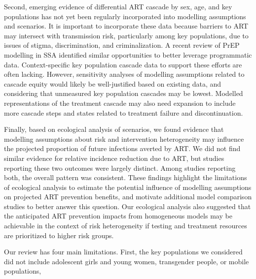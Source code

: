 \par %
Second, emerging evidence of differential ART cascade by sex, age, and key populations
\cite{Mountain2014,Lancaster2016,Green2020}
has not yet been regularly incorporated into modelling assumptions and scenarios.
It is important to incorporate these data because barriers to ART may intersect with transmission risk,
particularly among key populations, due to issues of stigma, discrimination, and criminalization.
\cite{Ortblad2019,Baral2019}
A recent review of PrEP modelling in SSA\cite{Case2019}
identified similar opportunities to better leverage programmatic data.
Context-specific key population cascade data to support these efforts are often lacking.\cite{Mountain2014}
However, sensitivity analyses of modelling assumptions related to cascade equity
would likely be well-justified based on existing data,\cite{Mountain2014,Green2020}
and considering that unmeasured key population cascades may be lowest.\cite{Roberts2020}
Modelled representations of the treatment cascade may also need expansion
to include more cascade steps and states related to treatment failure and discontinuation.
\par
Finally, based on ecological analysis of scenarios, we found evidence that
modelling assumptions about risk and intervention heterogeneity
may influence the projected proportion of future infections averted by ART.
We did not find similar evidence for relative incidence reduction due to ART,
but studies reporting these two outcomes were largely distinct.
Among studies reporting both, the overall pattern was consistent.
These findings highlight the limitations of ecological analysis to estimate
the potential influence of modelling assumptions on projected ART prevention benefits,
and motivate additional model comparison studies to better answer this question.
Our ecological analysis also suggested that the anticipated ART prevention impacts from homogeneous models
may be achievable in the context of risk heterogeneity
if testing and treatment resources are prioritized to higher risk groups.
\par
Our review has four main limitations.
First, the key populations we considered did not include
adolescent girls and young women, transgender people, or mobile populations,
